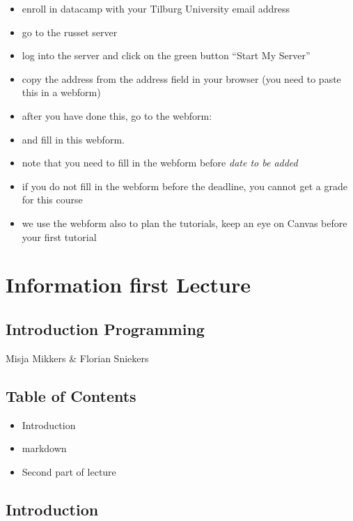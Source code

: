 \documentclass[]{book}
\providecommand{\tightlist}{%
  \setlength{\itemsep}{0pt}\setlength{\parskip}{0pt}}
\begin{document}
\begin{itemize}
\tightlist
\item
  enroll in datacamp with your Tilburg University email address
\item
  go to the russet server
\item
  log into the server and click on the green button ``Start My Server''
\item
  copy the address from the address field in your browser (you need to
  paste this in a webform)
\item
  after you have done this, go to the webform:
\item
  and fill in this webform.
\item
  note that you need to fill in the webform before \emph{date to be
  added}
\item
  if you do not fill in the webform before the deadline, you cannot get
  a grade for this course
\item
  we use the webform also to plan the tutorials, keep an eye on Canvas
  before your first tutorial
\end{itemize}

\chapter{Information first Lecture}\label{information-first-lecture}

\section{Introduction Programming}\label{introduction-programming}

Misja Mikkers \& Florian Sniekers

\section{Table of Contents}\label{table-of-contents}

\begin{itemize}
\item
  Introduction
\item
  markdown
\item
  Second part of lecture
\end{itemize}

\section{Introduction}\label{introduction}
\end{document}
